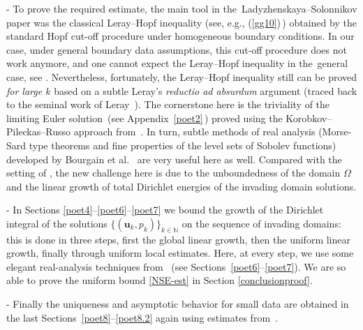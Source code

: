 \documentclass[11pt]{article}
\numberwithin{equation}{section}
\numberwithin{figure}{section}
\def\ue{{\mathbf u}}
\begin{document}
- To prove the required estimate, the main tool in the~Ladyzhenskaya--Solonnikov paper \cite{ladyzhenskaya1983determination}  
 was the classical Leray--Hopf inequality (see, e.g., (\ref{gg10})\,) obtained by the standard Hopf cut-off procedure under homogeneous boundary conditions. In our case, under general boundary data assumptions, this cut-off procedure does not work anymore, and one cannot expect the Leray--Hopf inequality in the~general case, see \cite{heywood2011impossibility,takeshita1993remark}. Nevertheless, fortunately, the Leray--Hopf inequality still can be proved {\it for large $k$} based on a subtle Leray's  \textit{reductio ad absurdum} argument (traced back to the seminal work of Leray~\cite{leray1933etude}). The cornerstone here is the triviality of the limiting Euler solution~(see Appendix~\ref{poet2}\,) proved using the Korobkov--Pileckas--Russo approach from~\cite{kpr,korobkov2015solution,korobkov2024steady}. In turn, subtle methods of real analysis (Morse-Sard type theorems and fine properties of the level sets of Sobolev functions) developed by Bourgain et al.~\cite{BKK13} are very useful here as well.  Compared with the setting of \cite{korobkov2015solution}, the new challenge here is due to the unboundedness of the domain $\Omega$ and the linear growth of total Dirichlet energies of the invading domain solutions. 
 \par
- In Sections \ref{poet4}--\ref{poet6}--\ref{poet7} we bound the growth of the Dirichlet integral of the solutions $\{(\ue_k,p_k) \}_{k \in \mathbb{N}}$ on the sequence of invading domains:
this is done in three steps, first the global linear growth, then the uniform linear growth, finally through uniform local estimates. Here, at every step, we use 
some elegant real-analysis techniques from~\cite{ladyzhenskaya1983determination}  (see Sections~\ref{poet6}--\ref{poet7}).  We are
so able to prove the uniform bound \eqref{NSE-est} in Section \ref{conclusionproof}.\par
- Finally the uniqueness and asymptotic behavior for small data are obtained in the last Sections~\ref{poet8}--\ref{poet8.2} again using estimates from~\cite{ladyzhenskaya1983determination}.
\end{document}

